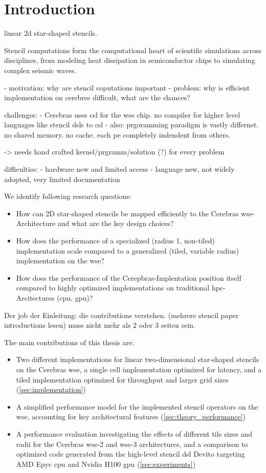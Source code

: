 \chapter{Introduction}

linear 2d star-shaped stencils. 

Stencil computations form the computational heart of scientific simulations across disciplines, from modeling heat dissipation in semiconductor chips to simulating complex seismic waves.

- motivation: why are stencil coputations important 
- problem: why is efficient implementation on cerebres difficult, what are the chances?

challenges:
- Cerebras uses \ac{csl} for the \ac{wse} chip. no compiler for higher level languages like stencil dsls to \ac{csl}
- also: prgoramming paradigm is vastly differnet. no shared memory. no cache. each \ac{pe} completely indendent from others.

-> needs hand crafted kernel/prgramm/solution (?) for every problem

difficulties:
- hardware new and limited access
- language new, not widely adopted, very limited documentation

We identify following research questions:
\begin{itemize}
    \item How can 2D star-shaped stencils be mapped efficiently to the Cerebras \ac{wse}-Architecture and what are the key design choices?
    \item How does the performance of a specialized (radius 1, non-tiled) implementation scale compared to a generalized (tiled, variable radius) implementation on the \ac{wse}?
    \item How does the performance of the Cerepbras-Implentation position itself compared to highly optimized implementations on traditional \ac{hpc}-Arcitectures (\ac{cpu}, \ac{gpu})? 
\end{itemize}

Der job der Einleitung: die contributions verstehen.
(mehrere stencil paper introductions lesen)
muss nicht mehr als 2 oder 3 seiten sein.

The main contributions of this thesis are:
\begin{itemize}
    \item Two different implementations for linear two-dimensional star-shaped stencils on the Cerebras \ac{wse}, a single cell implementation optimized for latency, and a tiled implementation optimized for throughput and larger grid sizes (\autoref{sec:implementation})
    \item A simplified performance model for the implemented stencil operators on the \ac{wse}, accounting for key architectural features (\autoref{sec:theory_performance})
    \item A performance evaluation investigating the effects of different tile sizes and radii for the Cerebras \ac{wse}-2 and \ac{wse}-3 architectures, and a comparison to optimized code generated from the high-level stencil \ac{dsl} Devito targeting AMD Epyc \ac{cpu} and Nvidia H100 \ac{gpu} (\autoref{sec:experiments})
\end{itemize}
